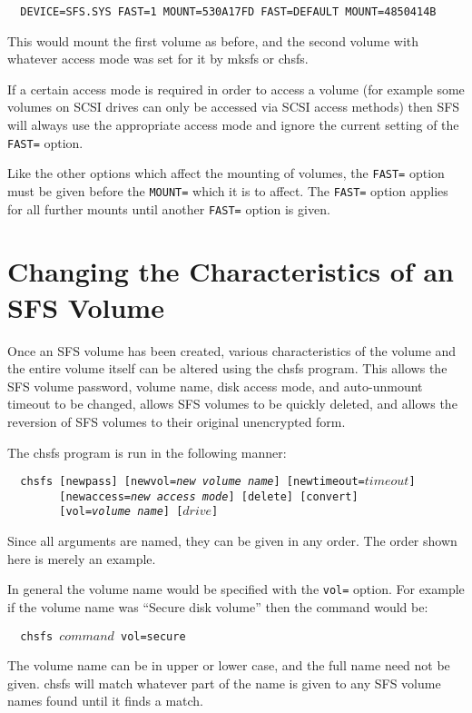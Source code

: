 \begin{verbatim}
  DEVICE=SFS.SYS FAST=1 MOUNT=530A17FD FAST=DEFAULT MOUNT=4850414B
\end{verbatim}

This would mount the first volume as before, and the second volume with
whatever access mode was set for it by mksfs or chsfs.

If a certain access mode is required in order to access a volume (for example
some volumes on SCSI drives can only be accessed via SCSI access methods) then
SFS will always use the appropriate access mode and ignore the current setting
of the {\tt FAST=} option.

Like the other options which affect the mounting of volumes, the {\tt FAST=} option 
must be given before the {\tt MOUNT=} which it is to affect.  The {\tt FAST=} option 
applies for all further mounts until another {\tt FAST=} option is given.


\section{Changing the Characteristics of an SFS Volume}

Once an SFS volume has been created, various characteristics of the volume and
the entire volume itself can be altered using the chsfs program.  This allows
the SFS volume password, volume name, disk access mode, and auto-unmount 
timeout to be changed, allows SFS volumes to be quickly deleted, and allows the 
reversion of SFS volumes to their original unencrypted form.

The chsfs program is run in the following manner:

{\tt \verb|  |chsfs [newpass] [newvol={\em new volume name}] [newtimeout=$timeout$]\\
\verb|        |[newaccess={\em new access mode}] [delete] [convert]\\
\verb|        |[vol={\em volume name}] [$drive$]}

Since all arguments are named, they can be given in any order.  The order shown
here is merely an example.

In general the volume name would be specified with the {\tt vol=} option.  For
example if the volume name was ``Secure disk volume'' then the command would be:

{\tt \verb|  |chsfs $command$ vol=secure}

The volume name can be in upper or lower case, and the full name need not be
given.  chsfs will match whatever part of the name is given to any SFS
volume names found until it finds a match.


